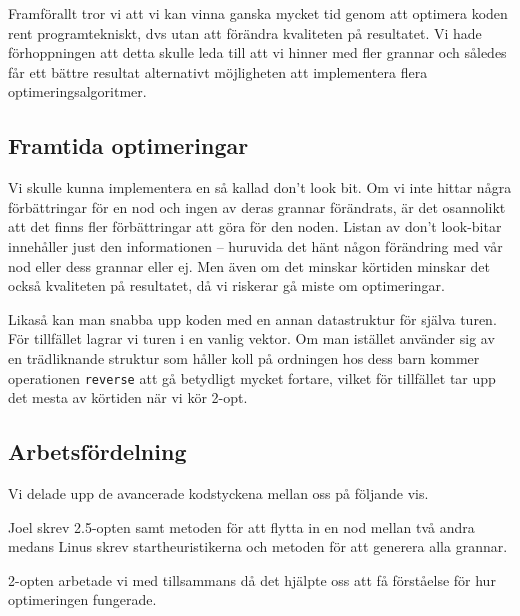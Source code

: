 \documentclass[a4paper,12pt]{article}
\renewcommand{\*}{\ensuremath{\cdot}}
\begin{document}
Framförallt tror vi att vi kan vinna ganska mycket tid genom att optimera koden rent programtekniskt, dvs utan att förändra kvaliteten på resultatet. Vi hade förhoppningen att detta skulle leda till att vi hinner med fler grannar och således får ett bättre resultat alternativt möjligheten att implementera flera optimeringsalgoritmer.

\subsection{Framtida optimeringar} 

Vi skulle kunna implementera en så kallad don't look bit. Om vi inte hittar
några förbättringar för en nod och ingen av deras grannar förändrats, är det
osannolikt att det finns fler förbättringar att göra för den noden. Listan av
don't look-bitar innehåller just den informationen -- huruvida det hänt någon
förändring med vår nod eller dess grannar eller ej. Men även om det minskar
körtiden minskar det också kvaliteten på resultatet, då vi riskerar gå miste om
optimeringar.

Likaså kan man snabba upp koden med en annan datastruktur för själva turen. För
tillfället lagrar vi turen i en vanlig vektor. Om man istället använder sig av
en trädliknande struktur som håller koll på ordningen hos dess barn kommer
operationen \texttt{reverse} att gå betydligt mycket fortare, vilket för
tillfället tar upp det mesta av körtiden när vi kör 2-opt.

\subsection{Arbetsfördelning}

Vi delade upp de avancerade kodstyckena mellan oss på följande vis.

Joel skrev 2.5-opten samt metoden för att flytta in en nod mellan två andra medans 
Linus skrev startheuristikerna och metoden för att generera alla grannar.

2-opten arbetade vi med tillsammans då det hjälpte oss att få förståelse för hur
optimeringen fungerade.
\end{document}
